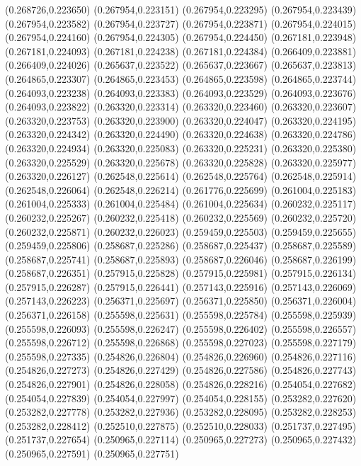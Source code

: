 (0.268726,0.223650)
(0.267954,0.223151)
(0.267954,0.223295)
(0.267954,0.223439)
(0.267954,0.223582)
(0.267954,0.223727)
(0.267954,0.223871)
(0.267954,0.224015)
(0.267954,0.224160)
(0.267954,0.224305)
(0.267954,0.224450)
(0.267181,0.223948)
(0.267181,0.224093)
(0.267181,0.224238)
(0.267181,0.224384)
(0.266409,0.223881)
(0.266409,0.224026)
(0.265637,0.223522)
(0.265637,0.223667)
(0.265637,0.223813)
(0.264865,0.223307)
(0.264865,0.223453)
(0.264865,0.223598)
(0.264865,0.223744)
(0.264093,0.223238)
(0.264093,0.223383)
(0.264093,0.223529)
(0.264093,0.223676)
(0.264093,0.223822)
(0.263320,0.223314)
(0.263320,0.223460)
(0.263320,0.223607)
(0.263320,0.223753)
(0.263320,0.223900)
(0.263320,0.224047)
(0.263320,0.224195)
(0.263320,0.224342)
(0.263320,0.224490)
(0.263320,0.224638)
(0.263320,0.224786)
(0.263320,0.224934)
(0.263320,0.225083)
(0.263320,0.225231)
(0.263320,0.225380)
(0.263320,0.225529)
(0.263320,0.225678)
(0.263320,0.225828)
(0.263320,0.225977)
(0.263320,0.226127)
(0.262548,0.225614)
(0.262548,0.225764)
(0.262548,0.225914)
(0.262548,0.226064)
(0.262548,0.226214)
(0.261776,0.225699)
(0.261004,0.225183)
(0.261004,0.225333)
(0.261004,0.225484)
(0.261004,0.225634)
(0.260232,0.225117)
(0.260232,0.225267)
(0.260232,0.225418)
(0.260232,0.225569)
(0.260232,0.225720)
(0.260232,0.225871)
(0.260232,0.226023)
(0.259459,0.225503)
(0.259459,0.225655)
(0.259459,0.225806)
(0.258687,0.225286)
(0.258687,0.225437)
(0.258687,0.225589)
(0.258687,0.225741)
(0.258687,0.225893)
(0.258687,0.226046)
(0.258687,0.226199)
(0.258687,0.226351)
(0.257915,0.225828)
(0.257915,0.225981)
(0.257915,0.226134)
(0.257915,0.226287)
(0.257915,0.226441)
(0.257143,0.225916)
(0.257143,0.226069)
(0.257143,0.226223)
(0.256371,0.225697)
(0.256371,0.225850)
(0.256371,0.226004)
(0.256371,0.226158)
(0.255598,0.225631)
(0.255598,0.225784)
(0.255598,0.225939)
(0.255598,0.226093)
(0.255598,0.226247)
(0.255598,0.226402)
(0.255598,0.226557)
(0.255598,0.226712)
(0.255598,0.226868)
(0.255598,0.227023)
(0.255598,0.227179)
(0.255598,0.227335)
(0.254826,0.226804)
(0.254826,0.226960)
(0.254826,0.227116)
(0.254826,0.227273)
(0.254826,0.227429)
(0.254826,0.227586)
(0.254826,0.227743)
(0.254826,0.227901)
(0.254826,0.228058)
(0.254826,0.228216)
(0.254054,0.227682)
(0.254054,0.227839)
(0.254054,0.227997)
(0.254054,0.228155)
(0.253282,0.227620)
(0.253282,0.227778)
(0.253282,0.227936)
(0.253282,0.228095)
(0.253282,0.228253)
(0.253282,0.228412)
(0.252510,0.227875)
(0.252510,0.228033)
(0.251737,0.227495)
(0.251737,0.227654)
(0.250965,0.227114)
(0.250965,0.227273)
(0.250965,0.227432)
(0.250965,0.227591)
(0.250965,0.227751)
